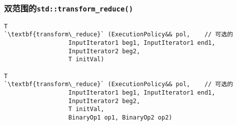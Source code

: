 \subsubsection{双范围的\texttt{std::transform\_reduce()}}\label{ch23.2.2.2}
\begin{lstlisting}[frame=single,xleftmargin=13pt,xrightmargin=13pt]
T
`\textbf{transform\_reduce}` (ExecutionPolicy&& pol,    // 可选的
                  InputIterator1 beg1, InputIterator1 end1,
                  InputIterator2 beg2,
                  T initVal)

T
`\textbf{transform\_reduce}` (ExecutionPolicy&& pol,    // 可选的
                  InputIterator1 beg1, InputIterator1 end1,
                  InputIterator2 beg2,
                  T initVal,
                  BinaryOp1 op1, BinaryOp2 op2)
\end{lstlisting}
